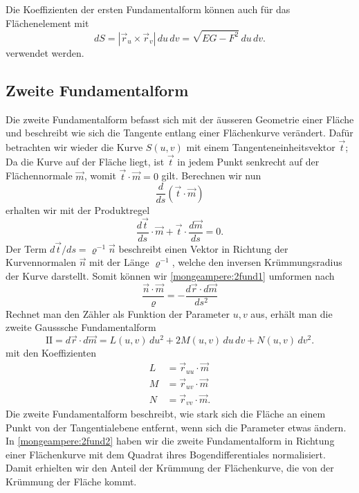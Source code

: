 Die Koeffizienten der ersten Fundamentalform können auch für das Flächenelement mit
\begin{equation}
  d S = |\vec r_u \times \vec r_v|\,d u \,d v = \sqrt{EG-F^2} \,d u \,d v.
  \label{mongeampere:ds}
\end{equation}
verwendet werden.

\subsection{Zweite Fundamentalform}
Die zweite Fundamentalform befasst sich mit der äusseren Geometrie einer 
Fläche und beschreibt wie sich die Tangente entlang einer Flächenkurve verändert.
Dafür betrachten wir wieder die Kurve $S(u,v)$ mit einem Tangenteneinheitsvektor 
$\vec t$;
Da die Kurve auf der Fläche liegt, ist $\vec t$ in jedem Punkt senkrecht auf der 
Flächennormale $\vec m$, womit $\vec t \cdot \vec m = 0$ gilt. 
Berechnen wir nun 
\begin{equation}
  \frac{d }{d s}(\vec t \cdot \vec m)
  \label{mongeampere:2fund0}
\end{equation}
erhalten wir mit der Produktregel
\begin{equation}
  \frac{d \vec t}{d s} \cdot \vec m + \vec t \cdot \frac{d \vec m}{d s} = 0. 
  \label{mongeampere:2fund1}
\end{equation}
Der Term $d \vec t / d s = \varrho^{-1} \vec n$ beschreibt einen Vektor in Richtung der Kurvennormalen 
$\vec n$ mit der Länge $\varrho^{-1}$, welche den inversen Krümmungsradius der Kurve 
darstellt.
Somit können wir \eqref{mongeampere:2fund1} umformen nach
\begin{equation}
  \frac{\vec n \cdot \vec m}{\varrho} = - \frac{d \vec r \cdot d \vec m }{d s^2} 
  \label{mongeampere:2fund2}
\end{equation}
Rechnet man den Zähler als Funktion der Parameter $u, v$ aus, erhält man die zweite 
Gausssche Fundamentalform
\begin{equation}
  \mathrm{I\!I} = d \vec r \cdot d \vec m  = L(u, v) \,d u^2 + 2 M (u,v) \,d u \,d v + N(u,v) \,d v^2.
  \label{mongeampere:2fund}
\end{equation}
mit den Koeffizienten
\begin{align*}
  L &= \vec r_{uu} \cdot \vec m \\ 
  M &= \vec r_{uv} \cdot \vec m \\
  N &= \vec r_{vv} \cdot \vec m.
  \label{mongeampere:2fundkoef}
\end{align*}
Die zweite Fundamentalform beschreibt, wie stark sich die Fläche an einem Punkt
von der Tangentialebene entfernt, wenn sich die Parameter etwas ändern.
In \eqref{mongeampere:2fund2} haben wir die zweite Fundamentalform in Richtung einer Flächenkurve mit
dem Quadrat ihres Bogendifferentiales normalisiert.
Damit erhielten wir den Anteil der Krümmung der Flächenkurve, die von der Krümmung der Fläche kommt.

